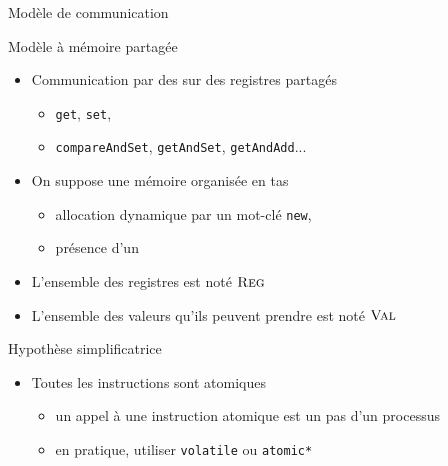 
\begingroup

\begin{frame}{Modèle de communication}

  \begin{block}{Modèle à mémoire partagée}
    \begin{itemize}
    \item Communication par des  sur des \alert{registres partagés} 
      \begin{itemize}
      \item \lstinline{get}, \lstinline{set},
      \item \lstinline{compareAndSet}, \lstinline{getAndSet}, \lstinline{getAndAdd}...
      \end{itemize}
    \item On suppose une mémoire  organisée en \alert{tas}
      \begin{itemize}
      \item allocation dynamique par un mot-clé \lstinline{new},
      \item présence d'un 
      \end{itemize}
    \item L'ensemble des registres est noté \alert{$\textsc{Reg}$}
    \item L'ensemble des valeurs qu'ils peuvent prendre est noté \alert{$\textsc{Val}$}
    \end{itemize}
  \end{block}

  \pause
  
  \begin{alertblock}{Hypothèse simplificatrice}
    \begin{itemize}
    \item Toutes les instructions sont \alert{atomiques}
      \begin{itemize}
      \item un appel à une instruction atomique est un pas d'un processus
      \item en pratique, utiliser \lstinline{volatile} ou \lstinline{atomic*}
      \end{itemize}
    \end{itemize}
  \end{alertblock}

\end{frame}

\endgroup
\endinput
